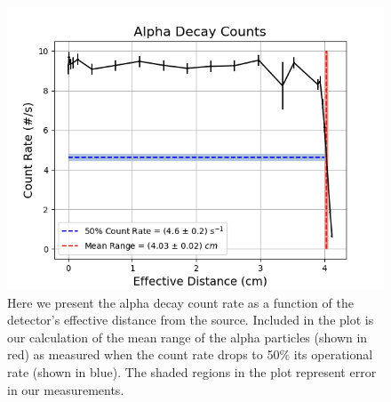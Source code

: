 \documentclass[10pt,aps,prb,twocolumn, nofootinbib]{revtex4-1}
\begin{document}
\begin{figure}[h!]
	\includegraphics[width=.5\textwidth,keepaspectratio]{alf_peak_cnts.png}
	\caption{Here we present the alpha decay count rate as a function of the detector's effective distance from the source.  Included in the plot is our calculation of the mean range of the alpha particles (shown in red) as measured when the count rate drops to 50$\%$ its operational rate (shown in blue).  The shaded regions in the plot represent error in our measurements.   \label{alph_decay_cnts}}
\end{figure} 
\end{document}
